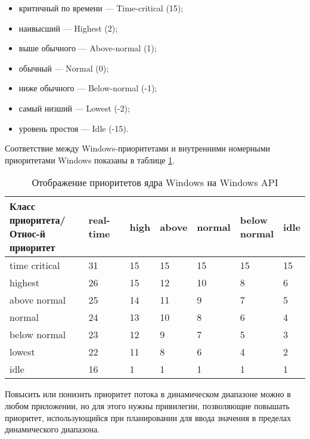 \begin{itemize}[label*=--]
	\item критичный по времени --- Time-critical (15);
	\item наивысший --- Highest (2);
	\item выше обычного --- Above-normal (1);
	\item обычный --- Normal (0);
	\item ниже обычного --- Below-normal (-1);
	\item самый низший --- Lowest (-2);
	\item уровень простоя --- Idle (-15).
\end{itemize}

Соответствие между Windows-приоритетами и внутренними номерными приоритетами Windows показаны в таблице \ref{tbl:priority}.

\begin{table}[ht]
	\begin{center}
		\begin{threeparttable}
			\caption{Отображение приоритетов ядра Windows на Windows API}
			\label{tbl:priority}
			\begin{tabular}{|l|l|l|l|l|l|l|}
				\hline
				\bfseries \makecell{Класс приоритета/ \\ Относ-й приоритет} & \bfseries real-time & \bfseries high & \bfseries above &
				\bfseries normal & \bfseries \makecell{below \\ normal} & \bfseries idle \\
				\hline
				time critical & 31 & 15 & 15 & 15 & 15 & 15 \\
				\hline
				highest & 26 & 15 & 12 & 10 & 8 & 6 \\
				\hline
				above normal & 25 & 14 & 11 & 9 & 7 & 5 \\
				\hline
				normal & 24 & 13 & 10 & 8 & 6 & 4 \\
				\hline
				below normal & 23 & 12 & 9 & 7 & 5 & 3 \\
				\hline
				lowest & 22 & 11 & 8 & 6 & 4 & 2 \\
				\hline
				idle & 16 & 1 & 1 & 1 & 1 & 1 \\
				\hline
			\end{tabular}
		\end{threeparttable}
	\end{center}
\end{table}

Повысить или понизить приоритет потока в динамическом диапазоне можно
в любом приложении, но для этого нужны привилегии, позволяющие повышать
приоритет, использующийся при планировании для ввода значения в пределах
динамического диапазона.


